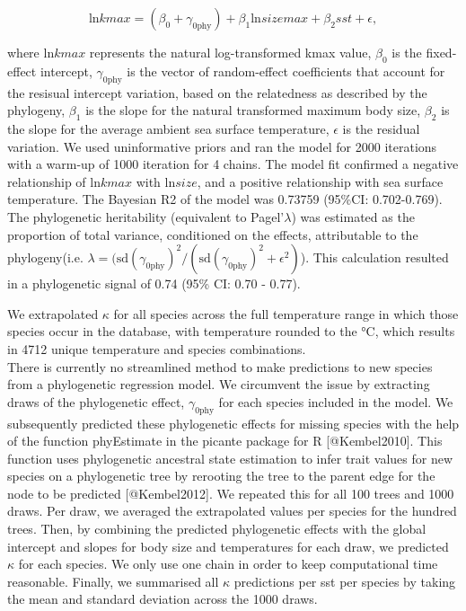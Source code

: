 \documentclass[12pt,a4paper]{article}
\begin{document}
\begin{equation}
\textrm{ln}kmax = (\beta_\textrm{0} + \gamma_\textrm{0phy}) +  \beta_\textrm{1} \textrm{ln}sizemax +  \beta_\textrm{2} sst + \epsilon,
    \label{kmax}
\end{equation}

\noindent where \(\textrm{ln}kmax\) represents the natural
log-transformed kmax value, \(\beta_\textrm{0}\) is the fixed-effect
intercept, \(\gamma_\textrm{0phy}\) is the vector of random-effect
coefficients that account for the resisual intercept variation, based on
the relatedness as described by the phylogeny, \(\beta_\textrm{1}\) is
the slope for the natural transformed maximum body size,
\(\beta_\textrm{2}\) is the slope for the average ambient sea surface
temperature, \(\epsilon\) is the residual variation. \noindent We used
uninformative priors and ran the model for 2000 iterations with a
warm-up of 1000 iteration for 4 chains. \noindent The model fit
confirmed a negative relationship of \(\textrm{ln}kmax\) with
\(\textrm{ln}size\), and a positive relationship with sea surface
temperature. The Bayesian R2 of the model was 0.73759 (95\%CI:
0.702-0.769). \noindent The phylogenetic heritability (equivalent to
Pagel'\(\lambda\)) was estimated as the proportion of total variance,
conditioned on the effects, attributable to the phylogeny(i.e.
\(\lambda = (\textrm{sd}(\gamma_\textrm{0phy})^2 / (\textrm{sd}(\gamma_\textrm{0phy})^2 + \epsilon^2)\)).
This calculation resulted in a phylogenetic signal of 0.74 (95\% CI:
0.70 - 0.77).

\noindent We extrapolated \(\kappa\) for all species across the full
temperature range in which those species occur in the database, with
temperature rounded to the °C, which results in 4712 unique temperature
and species combinations.\\
There is currently no streamlined method to make predictions to new
species from a phylogenetic regression model. We circumvent the issue by
extracting draws of the phylogenetic effect, \(\gamma_\textrm{0phy}\)
for each species included in the model. We subsequently predicted these
phylogenetic effects for missing species with the help of the function
phyEstimate in the picante package for R {[}@Kembel2010{]}. This
function uses phylogenetic ancestral state estimation to infer trait
values for new species on a phylogenetic tree by rerooting the tree to
the parent edge for the node to be predicted {[}@Kembel2012{]}. We
repeated this for all 100 trees and 1000 draws. Per draw, we averaged
the extrapolated values per species for the hundred trees. Then, by
combining the predicted phylogenetic effects with the global intercept
and slopes for body size and temperatures for each draw, we predicted
\(\kappa\) for each species. We only use one chain in order to keep
computational time reasonable. Finally, we summarised all \(\kappa\)
predictions per sst per species by taking the mean and standard
deviation across the 1000 draws.
\end{document}
